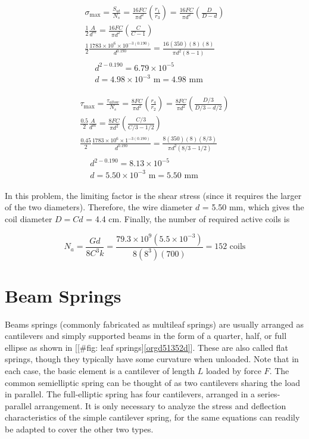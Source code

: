 \documentclass[a4paper,openany,12pt]{book}
\begin{document}
{{$$\begin{gathered}
  \sigma_{\max} = \frac{S_{ut}}{N_s} = \frac{16FC}{\pi d^2}\left( \frac{r_1}{r_3} \right) = \frac{16FC}{\pi d^2}\left( \frac{D}{D - d} \right) \\
  \frac{1}{2}\frac{A}{d^m} = \frac{16FC}{\pi d^2}\left( \frac{C}{C - 1} \right) \\ 
  \frac{1}{2}\frac{1783 \times 10^6 \times 10^{-3(0.190)}}{d^{0.190}} = \frac{16(350)(8)(8)}{\pi d^2(8 - 1)} \\
  \begin{aligned}
  &d^{2 - 0.190} = 6.79 \times 10^{-5} \\ 
  &d = 4.98 \times 10^{-3}\text{ m} = 4.98\text{ mm}
  \end{aligned}\end{gathered}$$

$$\begin{gathered}
  \tau_{\max} = \frac{\tau_{allow}}{N_s} = \frac{8FC}{\pi d^2}\left( \frac{r_4}{r_2} \right) = \frac{8FC}{\pi d^2}\left( \frac{D/3}{D/3 - d/2} \right) \\ 
  \frac{0.5}{2}\frac{A}{d^m} = \frac{8FC}{\pi d^2}\left( \frac{C/3}{C/3 - 1/2} \right) \\ 
  \frac{0.45}{2}\frac{1783 \times 10^6 \times 1^{-3(0.190)}}{d^{0.190}} = \frac{8(350)(8)(8/3)}{\pi d^2(8/3 - 1/2)} \\
  \begin{aligned}
  &d^{2 - 0.190} = 8.13 \times 10^{-5} \\ 
  &d = 5.50 \times 10^{-3}\text{ m} = 5.50 \text{ mm}
  \end{aligned}\end{gathered}$$

In this problem, the limiting factor is the shear stress (since it
requires the larger of the two diameters). Therefore, the wire diameter
\(d\) = 5.50 mm, which gives the coil diameter \(D = Cd\) = 4.4 cm. Finally,
the number of required active coils is

$$N_a = \frac{Gd}{8C^3k} = \frac{79.3 \times 10^9(5.5 \times 10^{-3})}{8(8^3)(700)} = 152\text{ coils}$$

\section{Beam Springs}
\label{sec:org67526ff}
Beams springs (commonly fabricated as multileaf springs) are usually
arranged as cantilevers and simply supported beams in the form of a
quarter, half, or full ellipse as shown in
[[\#fig: leaf springs]\ref{orgd51352d}]. These are also called flat
springs, though they typically have some curvature when unloaded. Note
that in each case, the basic element is a cantilever of length \(L\)
loaded by force \(F\). The common semielliptic spring can be thought of as
two cantilevers sharing the load in parallel. The full-elliptic spring
has four cantilevers, arranged in a series-parallel arrangement. It is
only necessary to analyze the stress and deflection characteristics of
the simple cantilever spring, for the same equations can readily be
adapted to cover the other two types.

}}
\end{document}
